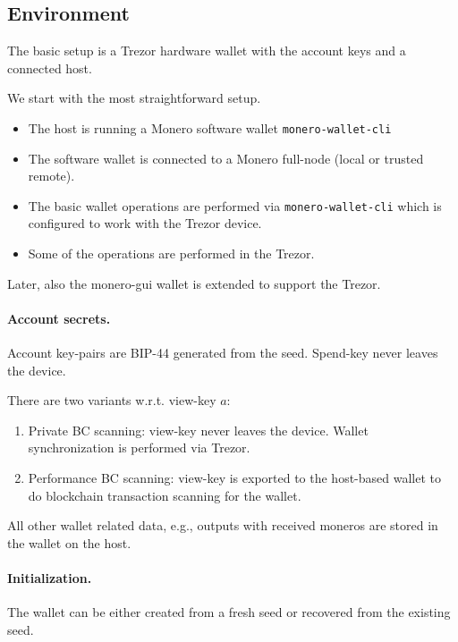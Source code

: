 \documentclass[]{article}
\begin{document}
\subsection{Environment}

The basic setup is a Trezor hardware wallet with the account keys and a connected host.

We start with the most straightforward setup.
\begin{itemize}
	\item The host is running a Monero software wallet \verb|monero-wallet-cli|
	
	\item  The software wallet is connected to a Monero full-node (local or trusted remote).
	
	\item The basic wallet operations are performed via \verb|monero-wallet-cli| which is configured to work with the Trezor device.
	
	\item Some of the operations are performed in the Trezor. 
\end{itemize}

Later, also the monero-gui wallet is extended to support the Trezor.

\paragraph{Account secrets.}
Account key-pairs are BIP-44 generated from the seed. Spend-key never leaves the device.

There are two variants w.r.t. view-key $a$:

\begin{enumerate}
	\item Private BC scanning: view-key never leaves the device. Wallet synchronization is performed via Trezor. 
	\item Performance BC scanning: view-key is exported to the host-based wallet to do blockchain transaction scanning for the wallet.
\end{enumerate}

All other wallet related data, e.g., outputs with received moneros are
stored in the wallet on the host. 

\paragraph{Initialization.} The wallet can be either created from a fresh seed or recovered from the existing seed.
\end{document}

